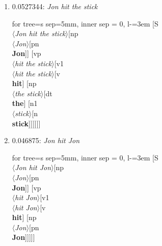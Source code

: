 \documentclass[11pt]{article}
\begin{document}
\begin{enumerate}
	\item  0.0527344: \textit{Jon hit the stick} \\[0.5em]
	\begin{forest}
	for tree={s sep=5mm, inner sep = 0, l-=3em}
	[S\\$\langle$\textit{Jon hit the stick}$\rangle$[np\\$\langle$\textit{Jon}$\rangle$[pn\\\textbf{Jon}]] [vp\\$\langle$\textit{hit the stick}$\rangle$[v1\\$\langle$\textit{hit the stick}$\rangle$[v\\\textbf{hit}] [np\\$\langle$\textit{the stick}$\rangle$[dt\\\textbf{the}] [n1\\$\langle$\textit{stick}$\rangle$[n\\\textbf{stick}]]]]]]
	\end{forest}
	\newpage

	\item  0.046875: \textit{Jon hit Jon} \\[0.5em]
	\begin{forest}
	for tree={s sep=5mm, inner sep = 0, l-=3em}
	[S\\$\langle$\textit{Jon hit Jon}$\rangle$[np\\$\langle$\textit{Jon}$\rangle$[pn\\\textbf{Jon}]] [vp\\$\langle$\textit{hit Jon}$\rangle$[v1\\$\langle$\textit{hit Jon}$\rangle$[v\\\textbf{hit}] [np\\$\langle$\textit{Jon}$\rangle$[pn\\\textbf{Jon}]]]]]
	\end{forest}
	\newpage


\end{enumerate}
\end{document}
